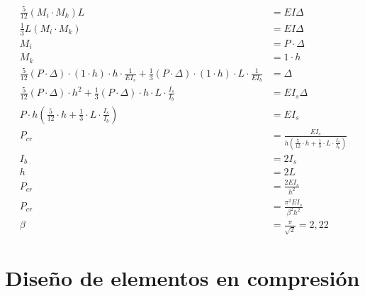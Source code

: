 \begin{exercise}
\begin{align*}
\frac{5}{12}(M_i\cdot M_k)L&=EI\Delta\\
\frac{1}{3}L(M_i\cdot M_k)&=EI\Delta\\
M_i&=P\cdot \Delta\\
M_k&=1\cdot h\\
\frac{5}{12}(P\cdot \Delta)\cdot(1\cdot h)\cdot h \cdot\frac{1}{EI_s}+\frac{1}{3}(P\cdot \Delta)\cdot(1\cdot h)\cdot L \cdot\frac{1}{EI_b}&=\Delta\\
\frac{5}{12}(P\cdot \Delta)\cdot h^2 +
\frac{1}{3}(P\cdot \Delta)\cdot h\cdot L \cdot\frac{I_s}{I_b}&=EI_s\Delta\\
P\cdot h(\frac{5}{12}\cdot h +
\frac{1}{3}\cdot L \cdot\frac{I_s}{I_b})&=EI_s\\
P_{cr}&=\frac{EI_s}{h(\frac{5}{12}\cdot h +
\frac{1}{3}\cdot L \cdot\frac{I_s}{I_b})}\\
I_b&=2I_s\\
h&=2L\\
P_{cr}&=\frac{2EI_s}{h^2}\\
P_{cr}&=\frac{\pi^2 EI_s}{\beta^2 h^2}\\
\beta&=\frac{\pi}{\sqrt{2}}=2,22
\end{align*}
\end{exercise}
\section{Diseño de elementos en compresión}
